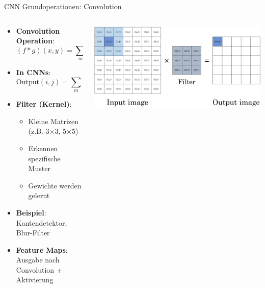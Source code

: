 \documentclass[aspectratio=1610, xcolor=dvipsnames, 9pt]{beamer}
\begin{document}
      \begin{frame}{CNN Grundoperationen: Convolution}
        \begin{columns}
          \begin{column}{0.7\textwidth}
            \begin{itemize}
              \item \textbf{Convolution Operation}:
              \begin{equation}
                (f * g)(x,y) = \sum_{m} \sum_{n} f(m,n) \cdot g(x-m, y-n)
              \end{equation}
              \item \textbf{In CNNs}:
              \begin{equation}
                \text{Output}(i,j) = \sum_{m} \sum_{n} \text{Filter}(m,n) \cdot \text{Input}(i+m, j+n)
              \end{equation}
              \item \textbf{Filter (Kernel)}:
              \begin{itemize}
                \item Kleine Matrizen (z.B. 3×3, 5×5)
                \item Erkennen spezifische Muster
                \item Gewichte werden gelernt
              \end{itemize}
              \item \textbf{Beispiel}: Kantendetektor, Blur-Filter
              \item \textbf{Feature Maps}: Ausgabe nach Convolution + Aktivierung
            \end{itemize}
          \end{column}
          \begin{column}{0.3\textwidth}
            \centering
            \includegraphics[width=\textwidth]{images/convolution.png}
          \end{column}
        \end{columns}
      \end{frame}
\end{document}
